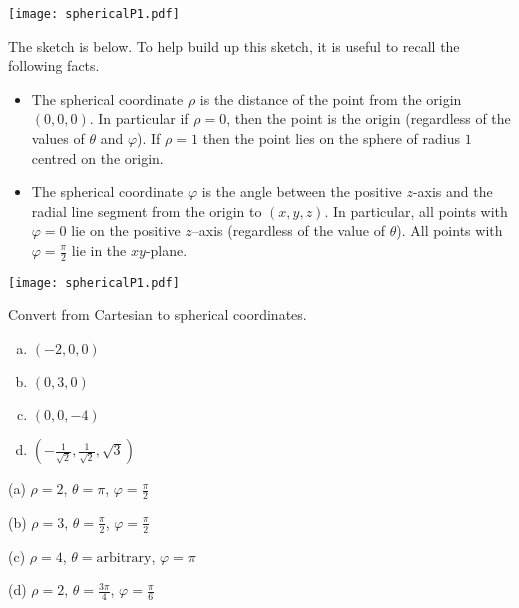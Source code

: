 %

\begin{answer}
\begin{center}
   \texttt{[image: sphericalP1.pdf]}
\end{center}
\end{answer}

\begin{solution}
The sketch is below. To help build up this sketch, it is useful to 
recall the following facts.
\begin{itemize}
\item
The spherical coordinate $\rho$ is the distance of the point from the 
origin $(0,0,0)$.
In particular if $\rho=0$, then the point is the origin (regardless of the values of $\theta$ and $\varphi$). If $\rho=1$ then the point lies on the 
sphere of radius $1$ centred on the origin.
\item
The spherical coordinate $\varphi$ is the angle between the positive $z$-axis 
and the radial line segment from the origin to $(x,y,z)$.
In particular, all points with $\varphi=0$ lie on the positive $z$--axis
(regardless of the value of $\theta$). All points with $\varphi=\frac{\pi}{2}$
lie in the $xy$-plane.
\end{itemize}
\begin{center}
   \texttt{[image: sphericalP1.pdf]}
\end{center}
\end{solution}

\begin{question}
Convert from Cartesian to spherical coordinates.
\begin{enumerate}[(a)]
\item $(-2,0,0)$
\item $(0,3,0)$
\item $(0,0,-4)$
\item $\left(-\frac{1}{\sqrt{2}},\frac{1}{\sqrt{2}},\sqrt{3}\right)$
\end{enumerate}

\end{question}

%

\begin{answer}
(a) $\rho=2$, $\theta=\pi$, $\varphi=\frac{\pi}{2}$

(b) $\rho=3$, $\theta=\frac{\pi}{2}$, $\varphi=\frac{\pi}{2}$

(c) $\rho=4$, $\theta=\text{arbitrary}$, $\varphi=\pi$

(d) $\rho=2$, $\theta=\frac{3\pi}{4}$, $\varphi=\frac{\pi}{6}$

\end{answer}

